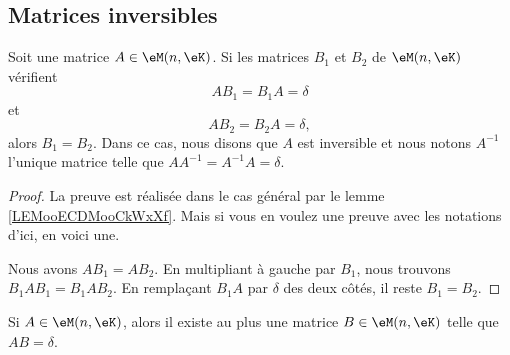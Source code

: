 \subsection{Matrices inversibles}

\begin{propositionDef}      \label{PROPooMLWRooRWfZXE}
    Soit une matrice \( A\in \eM(n,\eK)\). Si les matrices \( B_1\) et \( B_2\) de \( \eM(n,\eK)\) vérifient
    \begin{equation}
        AB_1=B_1A=\delta
    \end{equation}
    et
    \begin{equation}
        AB_2=B_2A=\delta,
    \end{equation}
    alors \( B_1=B_2\). Dans ce cas, nous disons que \( A\) est inversible et nous notons \( A^{-1}\) l'unique matrice telle que \( AA^{-1}=A^{-1}A=\delta\).
\end{propositionDef}

\begin{proof}
    La preuve est réalisée dans le cas général par le lemme \ref{LEMooECDMooCkWxXf}. Mais si vous en voulez une preuve avec les notations d'ici, en voici une.

    Nous avons $AB_1=AB_2$. En multipliant à gauche par \( B_1\), nous trouvons \( B_1AB_1=B_1AB_2\). En remplaçant \( B_1A\) par \( \delta\) des deux côtés, il reste \( B_1=B_2\).
\end{proof}

\begin{lemma}        \label{LEMooGZCTooQigDvC}
    Si \( A\in \eM(n,\eK)\), alors il existe au plus une matrice \( B\in \eM(n,\eK)\) telle que \( AB=\delta\).
\end{lemma}


